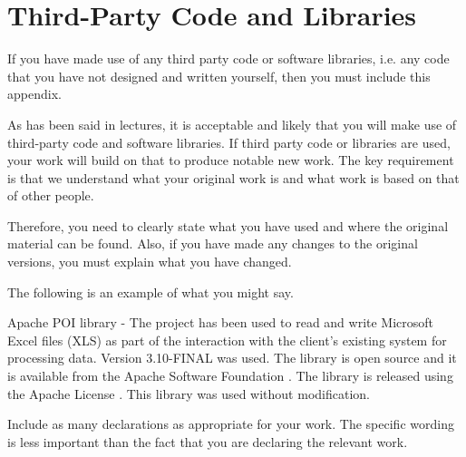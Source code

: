 \chapter{Third-Party Code and Libraries}

If you have made use of any third party code or software libraries, i.e. any code that you have not designed and written yourself, then you must include this appendix. 

As has been said in lectures, it is acceptable and likely that you will make use of third-party code and software libraries. If third party code or libraries are used, your work will build on that to produce notable new work. The key requirement is that we understand what your original work is and what work is based on that of other people. 

Therefore, you need to clearly state what you have used and where the original material can be found. Also, if you have made any changes to the original versions, you must explain what you have changed. 

The following is an example of what you might say. 

Apache POI library - The project has been used to read and write Microsoft Excel files (XLS) as part of the interaction with the client's existing system for processing data. Version 3.10-FINAL was used. The library is open source and it is available from the Apache Software Foundation 
\cite{apache_poi}. The library is released using the Apache License 
\cite{apache_license}. This library was used without modification. 

Include as many declarations as appropriate for your work. The specific wording is less important than the fact that you are declaring the relevant work.